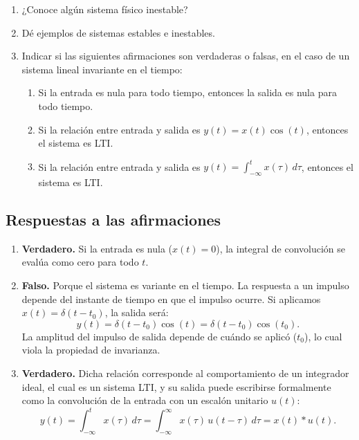 \documentclass[11pt,a4paper,openany]{book}
\begin{document}
\begin{enumerate}
	\item ¿Conoce algún sistema físico inestable?
	\item Dé ejemplos de sistemas estables e inestables.
	\item Indicar si las siguientes afirmaciones son verdaderas o falsas, en el caso de un sistema lineal invariante en el tiempo:
	\begin{enumerate}
		\item Si la entrada es nula para todo tiempo, entonces la salida es nula para todo tiempo.
		\item Si la relación entre entrada y salida es $y(t) = x(t) \cos(t)$, entonces el sistema es LTI.
		\item Si la relación entre entrada y salida es $y(t) = \int_{-\infty}^{t} x(\tau) \, d\tau$, entonces el sistema es LTI.
	\end{enumerate}
\end{enumerate}

\subsection{Respuestas a las afirmaciones}

\begin{enumerate}
	\item \textbf{Verdadero.} Si la entrada es nula ($x(t)=0$), la integral de convolución se evalúa como cero para todo $t$.
	
	\item \textbf{Falso.} Porque el sistema es variante en el tiempo. La respuesta a un impulso depende del instante de tiempo en que el impulso ocurre. Si aplicamos $x(t) = \delta(t - t_0)$, la salida será:
	\begin{equation}
		y(t) = \delta(t - t_{0}) \cos(t) = \delta(t - t_{0}) \cos(t_{0}).
	\end{equation}
	La amplitud del impulso de salida depende de cuándo se aplicó ($t_0$), lo cual viola la propiedad de invarianza.
	
	\item \textbf{Verdadero.} Dicha relación corresponde al comportamiento de un integrador ideal, el cual es un sistema LTI, y su salida puede escribirse formalmente como la convolución de la entrada con un escalón unitario $u(t)$:
	\begin{equation}
		y(t) = \int_{-\infty}^{t} x(\tau) \, d\tau = \int_{-\infty}^{\infty} x(\tau) \, u(t-\tau) \, d\tau = x(t) * u(t).
	\end{equation}
\end{enumerate}
\end{document}
